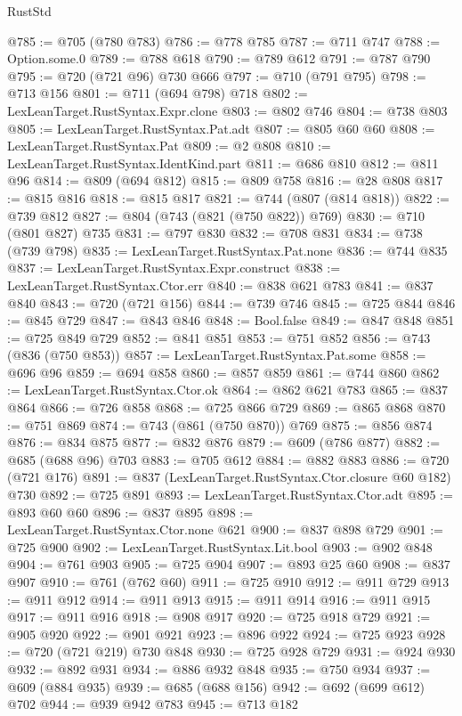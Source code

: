 \begin{lexlean}{RustStd}
\begin{coremodule}
@785 := @705 (@780 @783)
@786 := @778 @785
@787 := @711 @747
@788 := Option.some.{0}
@789 := @788 @618
@790 := @789 @612
@791 := @787 @790
@795 := @720 (@721 @96) @730 @666
@797 := @710 (@791 @795)
@798 := @713 @156
@801 := @711 (@694 @798) @718
@802 := LexLeanTarget.RustSyntax.Expr.clone
@803 := @802 @746
@804 := @738 @803
@805 := LexLeanTarget.RustSyntax.Pat.adt
@807 := @805 @60 @60
@808 := LexLeanTarget.RustSyntax.Pat
@809 := @2 @808
@810 := LexLeanTarget.RustSyntax.IdentKind.part
@811 := @686 @810
@812 := @811 @96
@814 := @809 (@694 @812)
@815 := @809 @758
@816 := @28 @808
@817 := @815 @816
@818 := @815 @817
@821 := @744 (@807 (@814 @818))
@822 := @739 @812
@827 := @804 (@743 (@821 (@750 @822)) @769)
@830 := @710 (@801 @827) @735
@831 := @797 @830
@832 := @708 @831
@834 := @738 (@739 @798)
@835 := LexLeanTarget.RustSyntax.Pat.none
@836 := @744 @835
@837 := LexLeanTarget.RustSyntax.Expr.construct
@838 := LexLeanTarget.RustSyntax.Ctor.err
@840 := @838 @621 @783
@841 := @837 @840
@843 := @720 (@721 @156)
@844 := @739 @746
@845 := @725 @844
@846 := @845 @729
@847 := @843 @846
@848 := Bool.false
@849 := @847 @848
@851 := @725 @849 @729
@852 := @841 @851
@853 := @751 @852
@856 := @743 (@836 (@750 @853))
@857 := LexLeanTarget.RustSyntax.Pat.some
@858 := @696 @96
@859 := @694 @858
@860 := @857 @859
@861 := @744 @860
@862 := LexLeanTarget.RustSyntax.Ctor.ok
@864 := @862 @621 @783
@865 := @837 @864
@866 := @726 @858
@868 := @725 @866 @729
@869 := @865 @868
@870 := @751 @869
@874 := @743 (@861 (@750 @870)) @769
@875 := @856 @874
@876 := @834 @875
@877 := @832 @876
@879 := @609 (@786 @877)
@882 := @685 (@688 @96) @703
@883 := @705 @612
@884 := @882 @883
@886 := @720 (@721 @176)
@891 := @837 (LexLeanTarget.RustSyntax.Ctor.closure @60 @182) @730
@892 := @725 @891
@893 := LexLeanTarget.RustSyntax.Ctor.adt
@895 := @893 @60 @60
@896 := @837 @895
@898 := LexLeanTarget.RustSyntax.Ctor.none @621
@900 := @837 @898 @729
@901 := @725 @900
@902 := LexLeanTarget.RustSyntax.Lit.bool
@903 := @902 @848
@904 := @761 @903
@905 := @725 @904
@907 := @893 @25 @60
@908 := @837 @907
@910 := @761 (@762 @60)
@911 := @725 @910
@912 := @911 @729
@913 := @911 @912
@914 := @911 @913
@915 := @911 @914
@916 := @911 @915
@917 := @911 @916
@918 := @908 @917
@920 := @725 @918 @729
@921 := @905 @920
@922 := @901 @921
@923 := @896 @922
@924 := @725 @923
@928 := @720 (@721 @219) @730 @848
@930 := @725 @928 @729
@931 := @924 @930
@932 := @892 @931
@934 := @886 @932 @848
@935 := @750 @934
@937 := @609 (@884 @935)
@939 := @685 (@688 @156)
@942 := @692 (@699 @612) @702
@944 := @939 @942 @783
@945 := @713 @182

\end{coremodule}
\end{lexlean}

